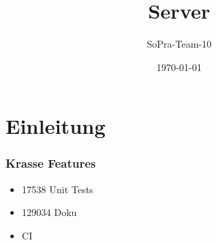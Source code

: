 \documentclass[aspectratio=169]{beamer}
\title{Server}
\author{SoPra-Team-10}
\date{\today}
\begin{document}
\maketitle
\frame{
    \tableofcontents
}

\section{Einleitung}
\begin{frame}
    \frametitle{Krasse Features}
    \begin{itemize}
        \item 17538 Unit Tests
            \pause
        \item 129034 Doku
            \pause
        \item CI
            \pause
    \end{itemize}
\end{frame}
\end{document}

